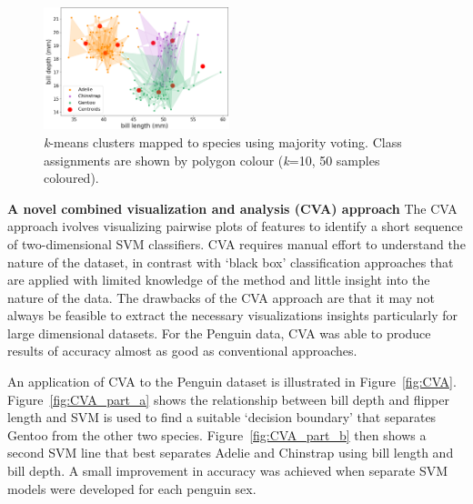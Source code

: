 \documentclass[12pt]{article}
\begin{document}
\begin{figure} %
  \centering
  \vspace{-2\baselineskip} %
  \includegraphics[width=0.48\textwidth]{kmeansmap.png} %
  \vspace{-0.5\baselineskip} %
  \caption{\textit{k}-means clusters mapped to species using majority voting. 
  Class assignments are shown by polygon colour (\textit{k}=10, 50 samples coloured).}
  \vspace{-0.5\baselineskip} %
  \label{fig:kmeansmap}
\end{figure}

\textbf{A novel combined visualization and analysis (CVA) approach}  
The CVA approach ivolves visualizing pairwise plots of features 
to identify a short sequence of two-dimensional SVM classifiers. 
CVA requires manual effort to understand the nature of the dataset, 
in contrast with `black box' classification approaches that are applied with limited knowledge 
of the method and little insight into the nature of the data. 
The drawbacks of the CVA approach are that it may not always be feasible to extract the necessary visualizations insights 
particularly for large dimensional datasets. 
For the Penguin data, CVA was able to produce results of accuracy almost as good 
as conventional approaches.

An application of CVA to the Penguin dataset is illustrated in Figure~\ref{fig:CVA}. 
Figure~\ref{fig:CVA_part_a} shows the relationship between bill depth and flipper length and 
SVM is used to find a suitable `decision boundary' that separates Gentoo from the other two species. 
Figure~\ref{fig:CVA_part_b} then shows a second SVM line that best separates Adelie and Chinstrap using bill length and bill depth. 
A small improvement in accuracy was achieved when separate SVM models were developed for each penguin sex.
\end{document}
